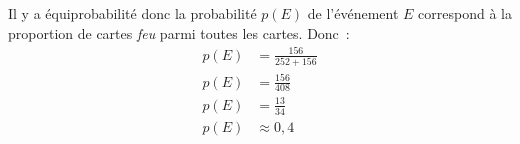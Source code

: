 \begin{enumerate}[itemsep=1em]
  Il y a équiprobabilité donc la probabilité $p(E)$ de l'événement $E$ correspond à la proportion de cartes \textit{feu} parmi toutes les cartes. Donc~:
  \begin{align*}
    p(E) &= \frac{156}{252+156}\\[1em]
    p(E) &= \frac{156}{408}\\[1em]
    p(E) &= \frac{13}{34}\\[1em]
    p(E) &\approx 0,4\\
  \end{align*}
\end{enumerate}
\medskip


